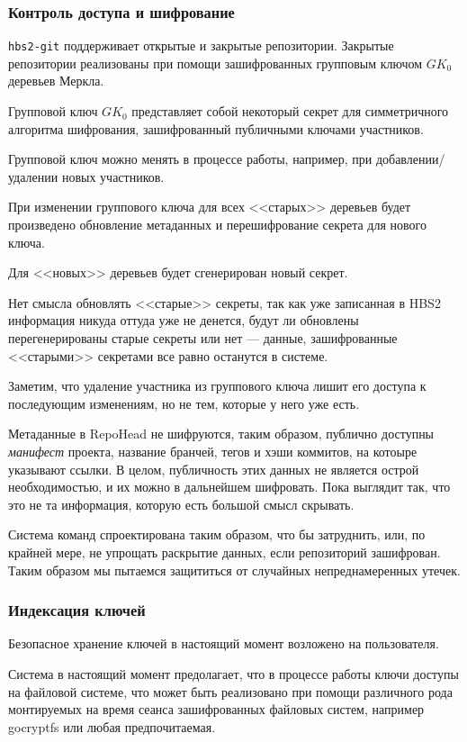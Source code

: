 \documentclass[11pt,a4paper]{article}
\begin{document}
\subsubsection*{Контроль доступа и шифрование}

\texttt{hbs2-git} поддерживает открытые и закрытые репозитории. Закрытые репозитории
реализованы при помощи зашифрованных групповым ключом $GK_0$ деревьев Меркла.

Групповой ключ $GK_0$ представляет собой некоторый секрет для симметричного алгоритма шифрования,
зашифрованный публичными ключами участников.

Групповой ключ можно менять в процессе работы, например, при добавлении/удалении новых участников.

При изменении группового ключа для всех <<старых>> деревьев будет произведено обновление метаданных
и перешифрование секрета для нового ключа.

Для <<новых>> деревьев будет сгенерирован новый секрет.

Нет смысла обновлять <<старые>> секреты, так как уже записанная в HBS2 информация никуда оттуда уже
не денется, будут ли обновлены перегенерированы старые секреты или нет --- данные, зашифрованные
<<старыми>> секретами все равно останутся в системе.

Заметим, что удаление участника из группового ключа лишит его доступа к последующим изменениям, но
не тем, которые у него уже есть.

Метаданные в RepoHead не шифруются, таким образом, публично доступны \textit{манифест} проекта,
название бранчей, тегов и хэши коммитов, на котоыре указывают ссылки. В целом, публичность этих
данных не является острой необходимостью, и их можно в дальнейшем шифровать. Пока выглядит так, что
это не та информация, которую есть большой смысл скрывать.

Система команд спроектирована таким образом, что бы затруднить, или, по крайней мере, не упрощать
раскрытие данных, если репозиторий зашифрован. Таким образом мы пытаемся защититься от случайных
непреднамеренных утечек.


\subsubsection*{Индексация ключей}

Безопасное хранение ключей в настоящий момент возложено на пользователя.

Система в настоящий момент предолагает, что в процессе работы ключи
доступы на файловой системе, что может быть реализовано при помощи
различного рода монтируемых на время сеанса зашифрованных файловых
систем, например gocryptfs или любая предпочитаемая.
\end{document}
